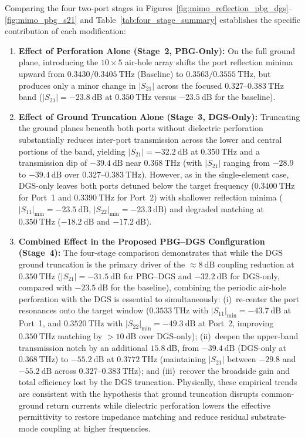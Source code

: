 \documentclass[referee,pdflatex,sn-mathphys-ay]{sn-jnl}
\begin{document}
Comparing the four two-port stages in Figures~\ref{fig:mimo_reflection_pbg_dgs}--\ref{fig:mimo_pbg_s21} and Table~\ref{tab:four_stage_summary} establishes the specific contribution of each modification:
\begin{enumerate}
    \item \textbf{Effect of Perforation Alone (Stage~2, PBG-Only):} On the full ground plane, introducing the $10 \times 5$ air-hole array shifts the port reflection minima upward from $0.3430 / 0.3405~\mathrm{THz}$ (Baseline) to $0.3563 / 0.3555~\mathrm{THz}$, but produces only a minor change in $|S_{21}|$ across the focused $0.327$--$0.383~\mathrm{THz}$ band ($|S_{21}| = -23.8~\mathrm{dB}$ at $0.350~\mathrm{THz}$ versus $-23.5~\mathrm{dB}$ for the baseline).
    \item \textbf{Effect of Ground Truncation Alone (Stage~3, DGS-Only):} Truncating the ground planes beneath both ports without dielectric perforation substantially reduces inter-port transmission across the lower and central portions of the band, yielding $|S_{21}| = -32.2~\mathrm{dB}$ at $0.350~\mathrm{THz}$ and a transmission dip of $-39.4~\mathrm{dB}$ near $0.368~\mathrm{THz}$ (with $|S_{21}|$ ranging from $-28.9$ to $-39.4~\mathrm{dB}$ over $0.327$--$0.383~\mathrm{THz}$). However, as in the single-element case, DGS-only leaves both ports detuned below the target frequency ($0.3400~\mathrm{THz}$ for Port~1 and $0.3390~\mathrm{THz}$ for Port~2) with shallower reflection minima ($|S_{11}|_{\min} = -23.5~\mathrm{dB}$, $|S_{22}|_{\min} = -23.3~\mathrm{dB}$) and degraded matching at $0.350~\mathrm{THz}$ ($-18.2~\mathrm{dB}$ and $-17.2~\mathrm{dB}$).
    \item \textbf{Combined Effect in the Proposed PBG--DGS Configuration (Stage~4):} The four-stage comparison demonstrates that while the DGS ground truncation is the primary driver of the $\approx 8~\mathrm{dB}$ coupling reduction at $0.350~\mathrm{THz}$ ($|S_{21}| = -31.5~\mathrm{dB}$ for PBG--DGS and $-32.2~\mathrm{dB}$ for DGS-only, compared with $-23.5~\mathrm{dB}$ for the baseline), combining the periodic air-hole perforation with the DGS is essential to simultaneously: (i)~re-center the port resonances onto the target window ($0.3533~\mathrm{THz}$ with $|S_{11}|_{\min} = -43.7~\mathrm{dB}$ at Port~1, and $0.3520~\mathrm{THz}$ with $|S_{22}|_{\min} = -49.3~\mathrm{dB}$ at Port~2, improving $0.350~\mathrm{THz}$ matching by $>10~\mathrm{dB}$ over DGS-only); (ii)~deepen the upper-band transmission notch by an additional $15.8~\mathrm{dB}$, from $-39.4~\mathrm{dB}$ (DGS-only at $0.368~\mathrm{THz}$) to \(-55.2~\mathrm{dB}\) at \(0.3772~\mathrm{THz}\) (maintaining $|S_{21}|$ between $-29.8$ and $-55.2~\mathrm{dB}$ across $0.327$--$0.383~\mathrm{THz}$); and (iii)~recover the broadside gain and total efficiency lost by the DGS truncation. Physically, these empirical trends are consistent with the hypothesis that ground truncation disrupts common-ground return currents while dielectric perforation lowers the effective permittivity to restore impedance matching and reduce residual substrate-mode coupling at higher frequencies.
\end{enumerate}
\end{document}
